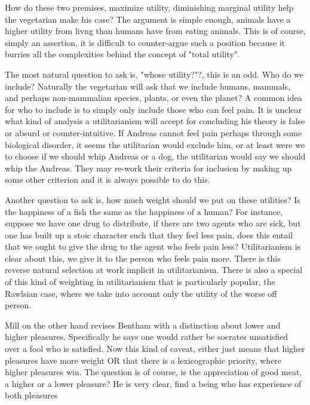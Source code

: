 \documentclass[12pt]{report}
\numberwithin{equation}{section}
\begin{document}
How do these two premises, maximize utility, diminishing marginal utility help the vegetarian make his case? The argument is simple enough, animals have a higher utility from livng than humans have from eating animals. This is of course, simply an assertion, it is difficult to counter-argue such a position because it burries all the complexities behind the concept of "total utility". 

The most natural question to ask is, "whose utility?"?, this is an odd. Who do we include? Naturally the vegetarian will ask that we include humans, mammals, and perhaps non-mammalian species, plants, or even the planet? A common idea for who to include is to simply only include those who can feel pain. It is unclear what kind of analysis a utilitarianism will accept for concluding his theory is false or absurd or counter-intuitive. If Andreas cannot feel pain perhaps through some biological disorder, it seems the utilitarian would exclude him, or at least were we to choose if we should whip Andreas or a dog, the utilitarian would say we should whip the Andreas.  They may re-work their criteria for inclusion by making up some other criterion and it is always possible to do this. 

Another question to ask is, how much weight should we put on these utilities? Is the happiness of a fish the same as the happiness of a human? For instance, suppose we have one drug to distribute, if there are two agents who are sick, but one has built up a stoic character such that they feel less pain, does this entail that we ought to give the drug to the agent who feels pain less? Utilitarianism is clear about this, we give it to the person who feels pain more. There is this reverse natural selection at work implicit in utilitarianism. There is also a special of this kind of weighting in utilitarianism that is particularly popular, the Rawlsian case, where we take into account only the utility of the worse off person. 

Mill on the other hand revises Bentham with a distinction about lower and higher pleasures. Specifically he says one would rather be socrates unsatisfied over a fool who is satisfied. Now this kind of caveat, either just means that higher pleasures have more weight OR that there is a lexicographic priority, where higher pleasures win. The question is of course, is the appreciation of good meat, a higher or a lower pleasure? He is very clear, find a being who has experience of both pleasures 
\end{document}
